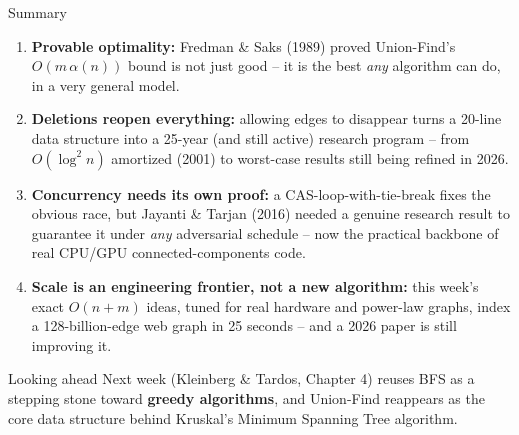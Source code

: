 \documentclass[11pt,aspectratio=169]{beamer}
\begin{document}
\begin{frame}{Summary}
  \small
  \begin{enumerate}
    \item \textbf{Provable optimality:} Fredman \& Saks (1989) proved Union-Find's
    $O(m\,\alpha(n))$ bound is not just good -- it is the best \emph{any} algorithm
    can do, in a very general model.
    \item \textbf{Deletions reopen everything:} allowing edges to disappear turns a
    20-line data structure into a 25-year (and still active) research program -- from
    $O(\log^2 n)$ amortized (2001) to worst-case results still being refined in 2026.
    \item \textbf{Concurrency needs its own proof:} a CAS-loop-with-tie-break fixes the
    obvious race, but Jayanti \& Tarjan (2016) needed a genuine research result to
    guarantee it under \emph{any} adversarial schedule -- now the practical backbone
    of real CPU/GPU connected-components code.
    \item \textbf{Scale is an engineering frontier, not a new algorithm:} this week's
    exact $O(n+m)$ ideas, tuned for real hardware and power-law graphs, index a
    128-billion-edge web graph in 25 seconds -- and a 2026 paper is still improving it.
  \end{enumerate}
  \begin{alertblock}{Looking ahead}
    Next week (Kleinberg \& Tardos, Chapter 4) reuses BFS as a stepping stone toward
    \textbf{greedy algorithms}, and Union-Find reappears as the core data structure
    behind Kruskal's Minimum Spanning Tree algorithm.
  \end{alertblock}
\end{frame}
\end{document}
